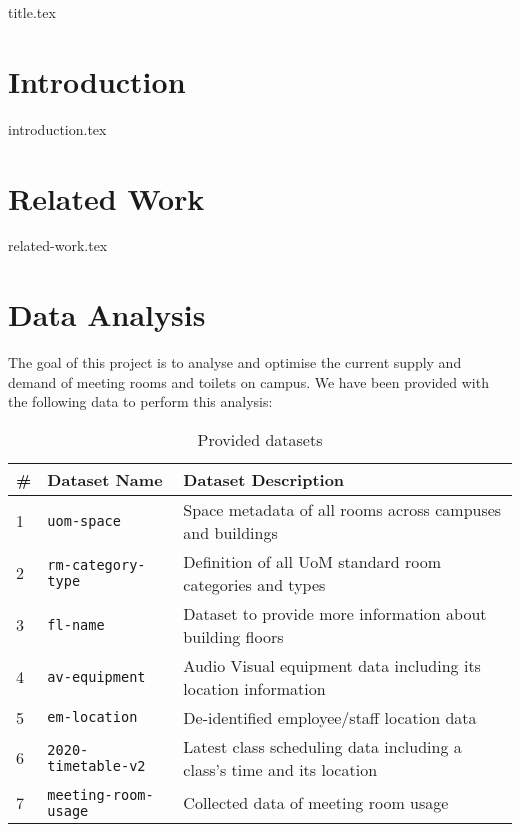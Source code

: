 \documentclass[a4paper, 11pt]{article}
\begin{document}
{title.tex}
\pagebreak


\thispagestyle{empty}
\setcounter{tocdepth}{3}
\tableofcontents{}
\pagebreak

\setcounter{page}{1}

\section{Introduction}
{introduction.tex}
\clearpage

\section{Related Work} \label{related_work}
{related-work.tex}
\clearpage

\section{Data Analysis}
The goal of this project is to analyse and optimise the current supply and demand of meeting rooms and toilets on campus. We have been provided with the following data to perform this analysis:

\begin{table}[H]
\centering
\begin{tabular}{|l|l|l|}
\hline
\# & \textbf{Dataset Name} & \textbf{Dataset Description}                                           \\ \hline
1  & \texttt{uom-space}             & Space metadata of all rooms across campuses and buildings              \\ \hline
2  & \texttt{rm-category-type}      & Definition of all UoM standard room categories and types               \\ \hline
3  & \texttt{fl-name}               & Dataset to provide more information about building floors              \\ \hline
4  & \texttt{av-equipment}         & Audio Visual equipment data including its location information         \\ \hline
5  & \texttt{em-location}           & De-identified employee/staff location data                             \\ \hline
6  & \texttt{2020-timetable-v2}     & Latest class scheduling data including a class's time and its location \\ \hline
7  & \texttt{meeting-room-usage}    & Collected data of meeting room usage                                   \\ \hline
\end{tabular}
\caption{Provided datasets}
\end{table}
\end{document}
